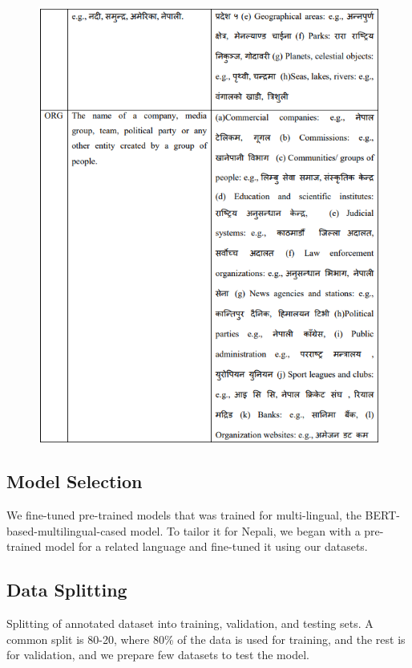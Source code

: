 \begin{figure}[H]
\centering
\includegraphics [scale=1.4]{img/Graphics/Annotation Guidelines2.png}

\end{figure}



 
 
\subsection{Model Selection}
We fine-tuned pre-trained models that was trained for multi-lingual, the BERT-based-multilingual-cased model. To tailor it for Nepali, we began with a pre-trained model for a related language and fine-tuned it using our datasets.

\subsection{Data Splitting}
Splitting of annotated dataset into training, validation, and testing sets. A common split is 80-20, where 80\% of the data is used for training, and the rest is for validation, and we prepare few datasets to test the model.

